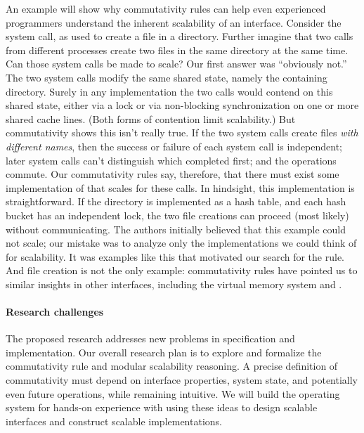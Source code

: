 An example will show why commutativity rules can help even experienced
programmers understand the inherent scalability of an interface.
%
Consider the  system call, as used to create a file in a
directory.
%
Further imagine that two  calls from different processes
create two files in the same directory at the same time.
%
Can those system calls be made to scale?
%
Our first answer was ``obviously not.''
%
The two system calls modify the same shared state, namely the containing
directory.
%
Surely in any implementation the two calls would contend on this shared
state, either via a lock or via non-blocking synchronization on one or
more shared cache lines. (Both forms of contention limit scalability.)
%
But commutativity shows this isn't really true.
%
If the two system calls create files \emph{with different names}, then the
success or failure of each system call is independent; later system calls can't
distinguish which completed first; and the operations commute.
%
Our commutativity rules say, therefore, that there must exist some
implementation of  that scales for these calls.
%
In hindsight, this implementation is straightforward.
%
If the directory is implemented as a hash table, and each hash bucket has an
independent lock, the two file creations can proceed (most likely) without
communicating.
%
The authors initially believed that this example could not scale; our
mistake was to analyze only the implementations we could think of for
scalability. It was examples like this that motivated our search for
the rule.
%
And file creation is not the only example: commutativity rules have pointed us
to similar insights in other interfaces, including the virtual memory system and
.

\paragraph{Research challenges}

The proposed research addresses new problems in specification and
implementation.  Our overall research plan is to explore and formalize
the commutativity rule and modular scalability reasoning.  A precise
definition of commutativity must depend on interface properties,
system state, and potentially even future operations, while remaining
intuitive.  We will build the {\sys} operating system for hands-on
experience with using these ideas to design scalable interfaces and
construct scalable implementations.

